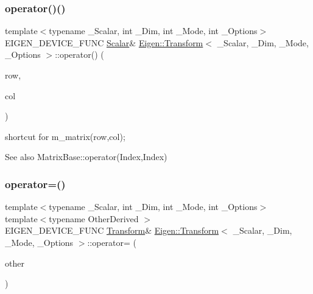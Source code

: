 \subsubsection{\texorpdfstring{operator()()}{operator()()}\hspace{0.1cm}{\footnotesize\ttfamily [2/2]}}
{\footnotesize\ttfamily template$<$typename \+\_\+\+Scalar, int \+\_\+\+Dim, int \+\_\+\+Mode, int \+\_\+\+Options$>$ \\
E\+I\+G\+E\+N\+\_\+\+D\+E\+V\+I\+C\+E\+\_\+\+F\+U\+NC \mbox{\hyperlink{class_eigen_1_1_transform_a4e69ced9d651745b8ed4eda46f41795d}{Scalar}}\& \mbox{\hyperlink{class_eigen_1_1_transform}{Eigen\+::\+Transform}}$<$ \+\_\+\+Scalar, \+\_\+\+Dim, \+\_\+\+Mode, \+\_\+\+Options $>$\+::operator() (\begin{DoxyParamCaption}\item[{\mbox{\hyperlink{class_eigen_1_1_transform_a49df3689ac2b736bcb564dec47d6486c}{Index}}}]{row,  }\item[{\mbox{\hyperlink{class_eigen_1_1_transform_a49df3689ac2b736bcb564dec47d6486c}{Index}}}]{col }\end{DoxyParamCaption})\hspace{0.3cm}{\ttfamily [inline]}}

shortcut for m\+\_\+matrix(row,col); \begin{DoxySeeAlso}{See also}
Matrix\+Base\+::operator(\+Index,\+Index) 
\end{DoxySeeAlso}
\mbox{\label{class_eigen_1_1_transform_ada0d6d0b497e2db223e23fcaa4e8961d}} 
\subsubsection{\texorpdfstring{operator=()}{operator=()}}
{\footnotesize\ttfamily template$<$typename \+\_\+\+Scalar, int \+\_\+\+Dim, int \+\_\+\+Mode, int \+\_\+\+Options$>$ \\
template$<$typename Other\+Derived $>$ \\
E\+I\+G\+E\+N\+\_\+\+D\+E\+V\+I\+C\+E\+\_\+\+F\+U\+NC \mbox{\hyperlink{class_eigen_1_1_transform}{Transform}}\& \mbox{\hyperlink{class_eigen_1_1_transform}{Eigen\+::\+Transform}}$<$ \+\_\+\+Scalar, \+\_\+\+Dim, \+\_\+\+Mode, \+\_\+\+Options $>$\+::operator= (\begin{DoxyParamCaption}\item[{const \mbox{\hyperlink{struct_eigen_1_1_eigen_base}{Eigen\+Base}}$<$ Other\+Derived $>$ \&}]{other }\end{DoxyParamCaption})\hspace{0.3cm}{\ttfamily [inline]}}

